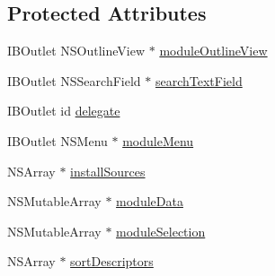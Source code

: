 \subsection*{Protected Attributes}
\begin{DoxyCompactItemize}
\item 
I\-B\-Outlet N\-S\-Outline\-View $\ast$ \hyperlink{interface_module_list_view_controller_abe1c0e9c5d74610660a89f165b494a89}{module\-Outline\-View}
\item 
I\-B\-Outlet N\-S\-Search\-Field $\ast$ \hyperlink{interface_module_list_view_controller_a979a79883da5a24697688be91ad03c52}{search\-Text\-Field}
\item 
I\-B\-Outlet id \hyperlink{interface_module_list_view_controller_a9f85cc570ea673f3b6001f8509d4bb11}{delegate}
\item 
I\-B\-Outlet N\-S\-Menu $\ast$ \hyperlink{interface_module_list_view_controller_a7db6a582718e6fb4b4bf7d4e483e4c85}{module\-Menu}
\item 
N\-S\-Array $\ast$ \hyperlink{interface_module_list_view_controller_ae383f5001e050db1f2faa6118238a8d9}{install\-Sources}
\item 
N\-S\-Mutable\-Array $\ast$ \hyperlink{interface_module_list_view_controller_acc171964aadf68f859860b18dd6d1629}{module\-Data}
\item 
N\-S\-Mutable\-Array $\ast$ \hyperlink{interface_module_list_view_controller_aa6c484ad670ccdac32c09a336ce49ef0}{module\-Selection}
\item 
N\-S\-Array $\ast$ \hyperlink{interface_module_list_view_controller_afc6f67ddfdee4a47a1bce742b605bcd4}{sort\-Descriptors}
\end{DoxyCompactItemize}


